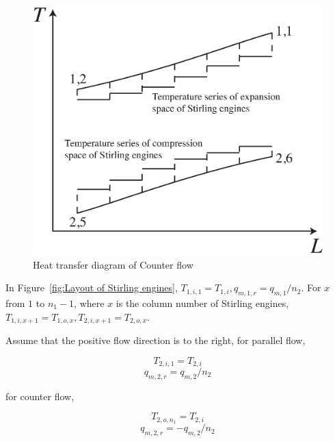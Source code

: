 \documentclass{article}
\begin{document}
\noindent \begin{figure}[htbp]
\begin{center}
	\includegraphics[width = 0.7\columnwidth]{./graphics/HeatTransfer_Counter}
	\caption{Heat transfer diagram of Counter flow}
	\label{fig:CounterFlow}
\end{center}
\end{figure}

In Figure~\ref{fig:Layout of Stirling engines}, $T_{1,i,1}=T_{1,i},q_{m,1,r}=q_{m,1}/n_{2}$. For $x$ from $1$ to $n_1-1$, where $x$ is the column number of Stirling engines, $T_{1,i,x+1}=T_{1,o,x},T_{2,i,x+1}=T_{2,o,x}$.

Assume that the positive flow direction is to the right, for parallel flow,

\begin{equation*}
	T_{2,i,1}=T_{2,i}\label{eq:T_2_i_1}
\end{equation*}
\begin{equation*}
	q_{m,2,r}=q_{m,2}/n_{2}
\end{equation*}

for counter flow,

\begin{equation*}
	T_{2,o,n_1}=T_{2,i}\label{eq:T_2_o_n1}
\end{equation*}
\begin{equation*}
	q_{m,2,r}=-q_{m,2}/n_{2}
\end{equation*}
\end{document}
